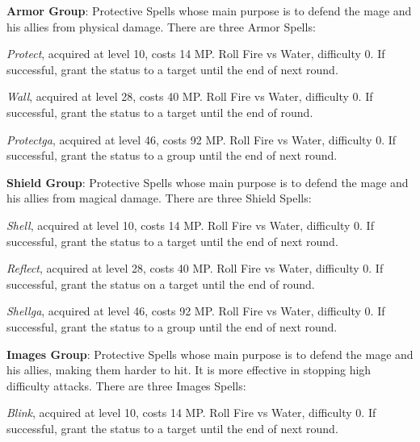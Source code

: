 \begin{multicols}{2}
    \ffcrystal[type=level,height=8pt]

    \textbf{Armor Group}: Protective Spells whose main purpose is to defend the mage and his allies from physical damage. There are three Armor Spells:

    \textit{Protect}, acquired at level 10, costs 14 MP\@. Roll Fire vs Water, difficulty 0. If successful, grant the  status to a target until the end of next round.

    \textit{Wall}, acquired at level 28, costs 40 MP\@. Roll Fire vs Water, difficulty 0. If successful, grant the  status to a target until the end of round.

    \textit{Protectga}, acquired at level 46, costs 92 MP\@. Roll Fire vs Water, difficulty 0. If successful, grant the  status to a group until the end of next round.

    \ffcrystal[type=level,height=8pt]

    \textbf{Shield Group}: Protective Spells whose main purpose is to defend the mage and his allies from magical damage. There are three Shield Spells:

    \textit{Shell}, acquired at level 10, costs 14 MP\@. Roll Fire vs Water, difficulty 0. If successful, grant the  status to a target until the end of next round.

    \textit{Reflect}, acquired at level 28, costs 40 MP\@. Roll Fire vs Water, difficulty 0. If successful, grant the  status on a target until the end of round.
    
    \textit{Shellga}, acquired at level 46, costs 92 MP\@. Roll Fire vs Water, difficulty 0. If successful, grant the  status to a group until the end of next round.    

    \ffcrystal[type=level,height=8pt]

    \textbf{Images Group}: Protective Spells whose main purpose is to defend the mage and his allies, making them harder to hit. It is more effective in stopping high difficulty attacks. There are three Images Spells:

    \textit{Blink}, acquired at level 10, costs 14 MP\@. Roll Fire vs Water, difficulty 0. If successful, grant the  status to a target until the end of next round.


\end{multicols}
